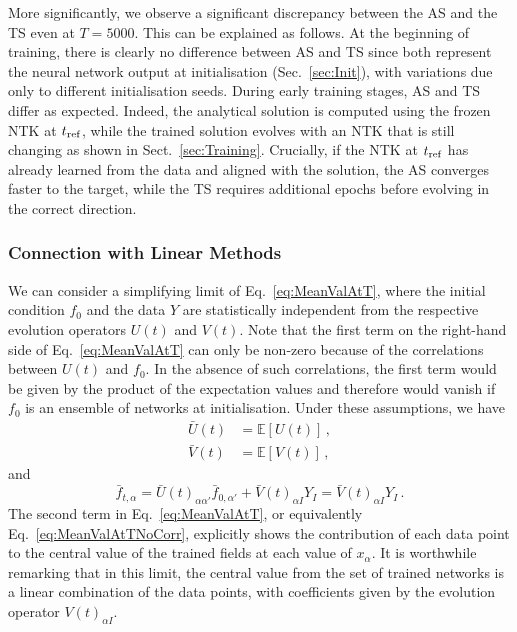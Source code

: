 More significantly, we observe a significant discrepancy between the AS and the
TS even at $T=5000$. This can be explained as follows. At the beginning of
training, there is clearly no difference between AS and TS since both represent
the neural network output at initialisation (Sec.~\ref{sec:Init}), with
variations due only to different initialisation seeds. During early training
stages, AS and TS differ as expected. Indeed, the analytical solution is
computed using the frozen NTK at $t_{\rm ref}$, while the trained solution
evolves with an NTK that is still changing as shown in Sect.~\ref{sec:Training}.
Crucially, if the NTK at $t_{\rm ref}$ has already learned from the data and
aligned with the solution, the AS converges faster to the target, while the TS
requires additional epochs before evolving in the correct direction.


\subsubsection{Connection with Linear Methods}
\label{sec:ConnectWithLinear}
We can consider a simplifying limit of Eq.~\eqref{eq:MeanValAtT}, where the
initial condition $f_0$ and the data $Y$ are statistically independent from the
respective evolution operators $U(t)$ and $V(t)$. Note that the first term on
the right-hand side of Eq.~\eqref{eq:MeanValAtT} can only be non-zero because of
the correlations between $U(t)$ and $f_0$. In the absence of such correlations,
the first term would be given by the product of the expectation values and
therefore would vanish if $f_0$ is an ensemble of networks at initialisation.
Under these assumptions, we have
\begin{align}
    \label{eq:MeanUt}
    \bar{U}(t)
        &= \mathbb{E}\left[U(t)\right]\, , \\
    \label{eq:MeanVt}
    \bar{V}(t)
        &= \mathbb{E}\left[V(t)\right]\, ,
\end{align}
and
\begin{equation}
    \label{eq:MeanValAtTNoCorr}
    \bar{f}_{t,\alpha} = \bar{U}(t)_{\alpha\alpha'} \bar{f}_{0,\alpha'}
        + \bar{V}(t)_{\alpha I} Y_I = \bar{V}(t)_{\alpha I} Y_I \, .
\end{equation}
The second term in Eq.~\eqref{eq:MeanValAtT}, or equivalently
Eq.~\eqref{eq:MeanValAtTNoCorr}, explicitly shows the contribution of each data
point to the central value of the trained fields at each value of $x_{\alpha}$.
It is worthwhile remarking that in this limit, the central value from the set of
trained networks is a linear combination of the data points, with coefficients
given by the evolution operator $V(t)_{\alpha I}$.

